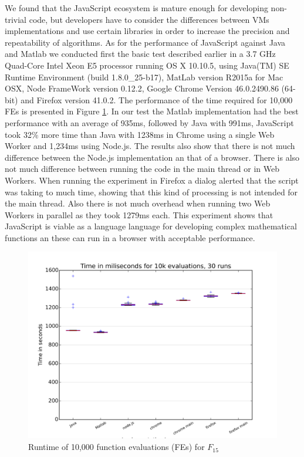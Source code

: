 \documentclass[journal,onecolumn]{IEEEtran}
\begin{document}
We found that the JavaScript ecosystem is mature enough for developing non-trivial 
code, but developers have to consider the differences between VMs implementations
and use certain libraries in order to increase the precision and repeatability of
algorithms. As for the performance of JavaScript against Java and Matlab
we conducted first the basic test described earlier in a 3.7 GHz Quad-Core
Intel Xeon E5 processor running OS X 10.10.5, 
using Java(TM) SE Runtime Environment (build 1.8.0\_25-b17), 
MatLab version R2015a for Mac OSX, Node FrameWork version 0.12.2,
Google Chrome Version 46.0.2490.86 (64-bit) 
and Firefox version 41.0.2. The performance of the time required for 10,000 FEs is presented in
Figure \ref{fig:f15_times}. In our test the Matlab implementation had the best
performance with an average of 935ms, followed by Java with
991ms, JavaScript took 32\% more time than Java with 1238ms in Chrome using a 
single Web Worker and 1,234ms using Node.js. %
The results also show that there is not much difference between the Node.js
implementation an that of a
browser. There is also not much difference between running the code in the main thread or in Web
Workers. When running the experiment in Firefox a dialog alerted that the
script was taking to much time, showing that this
kind of processing is not intended for the main thread. Also there is not much overhead
when running two
Web Workers in parallel as they took 1279ms each. This experiment
shows that JavaScript is viable as a language
language for developing complex mathematical functions an these can run in a browser
with acceptable performance. 
\begin{figure}[!htb]
\centering
\includegraphics[width=0.9\linewidth]{f15_times.png}
\caption{ Runtime of 10,000 function evaluations (FEs) for $F_{15}$} 
\label{fig:f15_times}
\end{figure}
\end{document}
